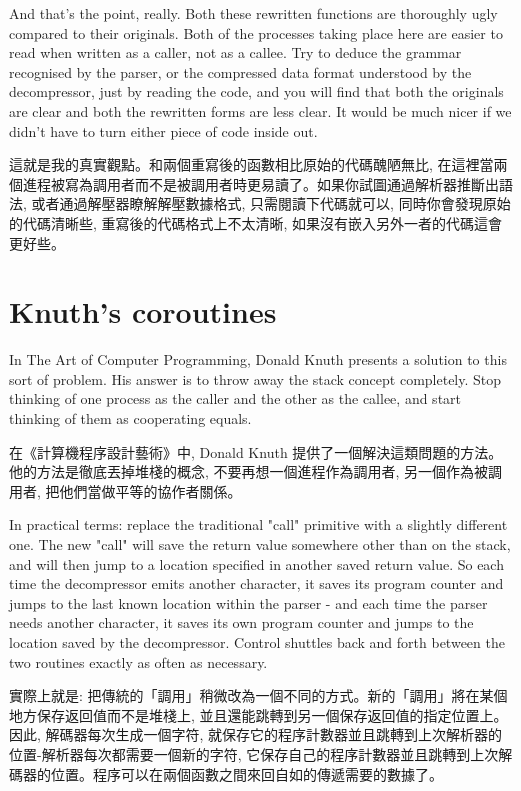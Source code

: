 \documentclass[12pt]{article}
\begin{document}
\begin{CJK}{UTF8}{bsmi}
 And that's the point, really. Both these rewritten functions are thoroughly ugly compared to their originals. Both of the processes taking place here are easier to read when written as a caller, not as a callee. Try to deduce the grammar recognised by the parser, or the compressed data format understood by the decompressor, just by reading the code, and you will find that both the originals are clear and both the rewritten forms are less clear. It would be much nicer if we didn't have to turn either piece of code inside out.


這就是我的真實觀點。和兩個重寫後的函數相比原始的代碼醜陋無比, 在這裡當兩個進程被寫為調用者而不是被調用者時更易讀了。如果你試圖通過解析器推斷出語法, 或者通過解壓器瞭解解壓數據格式, 只需閱讀下代碼就可以, 同時你會發現原始的代碼清晰些, 重寫後的代碼格式上不太清晰, 如果沒有嵌入另外一者的代碼這會更好些。 

\section{Knuth's coroutines}
 In The Art of Computer Programming, Donald Knuth presents a solution to this sort of problem. His answer is to throw away the stack concept completely. Stop thinking of one process as the caller and the other as the callee, and start thinking of them as cooperating equals.

在《計算機程序設計藝術》中, Donald Knuth 提供了一個解決這類問題的方法。他的方法是徹底丟掉堆棧的概念, 不要再想一個進程作為調用者, 另一個作為被調用者, 把他們當做平等的協作者關係。

 In practical terms: replace the traditional "call" primitive with a slightly different one. The new "call" will save the return value somewhere other than on the stack, and will then jump to a location specified in another saved return value. So each time the decompressor emits another character, it saves its program counter and jumps to the last known location within the parser - and each time the parser needs another character, it saves its own program counter and jumps to the location saved by the decompressor. Control shuttles back and forth between the two routines exactly as often as necessary.

實際上就是: 把傳統的「調用」稍微改為一個不同的方式。新的「調用」將在某個地方保存返回值而不是堆棧上, 並且還能跳轉到另一個保存返回值的指定位置上。因此, 解碼器每次生成一個字符, 就保存它的程序計數器並且跳轉到上次解析器的位置-解析器每次都需要一個新的字符, 它保存自己的程序計數器並且跳轉到上次解碼器的位置。程序可以在兩個函數之間來回自如的傳遞需要的數據了。


\end{CJK}
\end{document}
